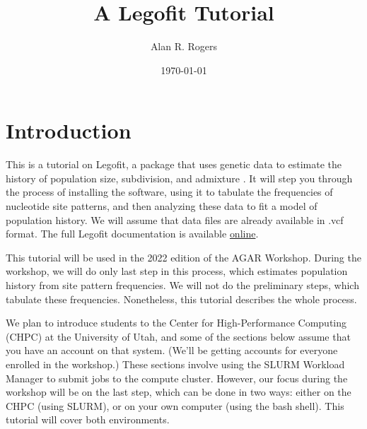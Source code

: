 \documentclass[11pt]{article}
\begin{document}
\title{A Legofit Tutorial}
\author{Alan R. Rogers}
\date{\today}
\maketitle
\tableofcontents

\section{Introduction}
This is a tutorial on Legofit, a package that uses genetic data to
estimate the history of population size, subdivision, and admixture
\citep{Rogers:BMC-20-526, Rogers:PCJ-2-e32}. It will step you through
the process of installing the software, using it to tabulate the
frequencies of nucleotide site patterns, and then analyzing these data
to fit a model of population history. We will assume that data files
are already available in .vcf format. The full Legofit documentation
is available
\href{http://alanrogers.github.io/legofit/html/index.html}{online}.

This tutorial will be used in the 2022 edition of the AGAR
Workshop. During the workshop, we will do only last step in this
process, which estimates population history from site pattern
frequencies. We will not do the preliminary steps, which tabulate
these frequencies. Nonetheless, this tutorial describes the whole
process.

We plan to introduce students to the Center for High-Performance
Computing (CHPC) at the University of Utah, and some of the sections
below assume that you have an account on that system. (We'll be
getting accounts for everyone enrolled in the workshop.) These
sections involve using the SLURM Workload Manager to submit jobs to
the compute cluster. However, our focus during the workshop will be on
the last step, which can be done in two ways: either on the CHPC
(using SLURM), or on your own computer (using the bash shell). This
tutorial will cover both environments.
\end{document}
